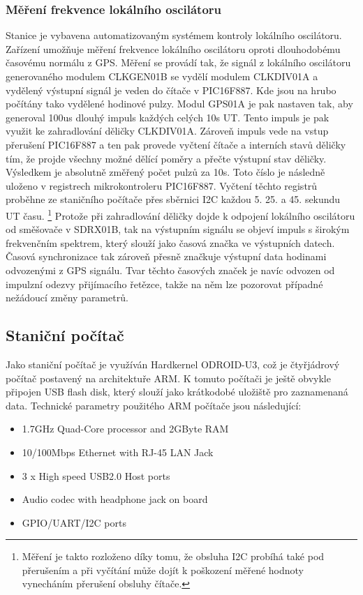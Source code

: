 \documentclass[12pt,a4paper,oneside]{article}
\begin{document}
\subsubsection{Měření frekvence lokálního oscilátoru}

Stanice je vybavena automatizovaným systémem kontroly lokálního oscilátoru. Zařízení umožňuje měření frekvence lokálního oscilátoru oproti dlouhodobému časovému normálu z GPS. Měření se provádí tak, že signál z lokálního oscilátoru generovaného modulem CLKGEN01B se vydělí modulem CLKDIV01A a vydělený výstupní signál je veden do čítače v PIC16F887. Kde jsou na hrubo počítány tako vydělené hodinové pulzy. 
Modul GPS01A je pak nastaven tak, aby generoval 100us dlouhý impuls každých celých 10s UT.  Tento impuls je pak využit ke zahradlování děličky CLKDIV01A.  Zároveň impuls vede na vstup přerušení PIC16F887 a ten pak provede vyčtení čítače a interních stavů děličky tím, že projde všechny možné dělící poměry a přečte výstupní stav děličky. Výsledkem je absolutně změřený počet pulzů za 10s.  Toto číslo je následně uloženo v registrech mikrokontroleru PIC16F887. Vyčtení těchto registrů proběhne ze staničního počítače přes sběrnici I2C každou 5. 25. a 45. sekundu UT času. \footnote{Měření je takto rozloženo díky tomu, že obsluha I2C probíhá také pod přerušením a při vyčítání může dojít k poškození měřené hodnoty vynecháním přerušení obsluhy čítače.}
Protože při zahradlování děličky dojde k odpojení lokálního oscilátoru od směšovače v SDRX01B, tak na výstupním signálu se objeví impuls s širokým frekvenčním spektrem, který slouží jako časová značka ve výstupních datech.  Časová synchronizace tak zároveň přesně značkuje výstupní data hodinami odvozenými z GPS signálu. Tvar těchto časových značek je navíc odvozen od impulzní odezvy přijímacího řetězce, takže na něm lze pozorovat případné nežádoucí změny parametrů. 

\subsection{Staniční počítač}

Jako staniční počítač je využíván Hardkernel ODROID-U3, což je čtyřjádrový počítač postavený na architektuře ARM. K tomuto počítači je ještě obvykle připojen USB flash disk, který slouží jako krátkodobé uložiště pro zaznamenaná data.  Technické parametry použitého ARM počítače jsou následující: 

\begin{itemize}
\item 1.7GHz Quad-Core processor and 2GByte RAM
\item 10/100Mbps Ethernet with RJ-45 LAN Jack
\item 3 x High speed USB2.0 Host ports
\item Audio codec with headphone jack on board
\item GPIO/UART/I2C ports
\end{itemize}
\end{document}
